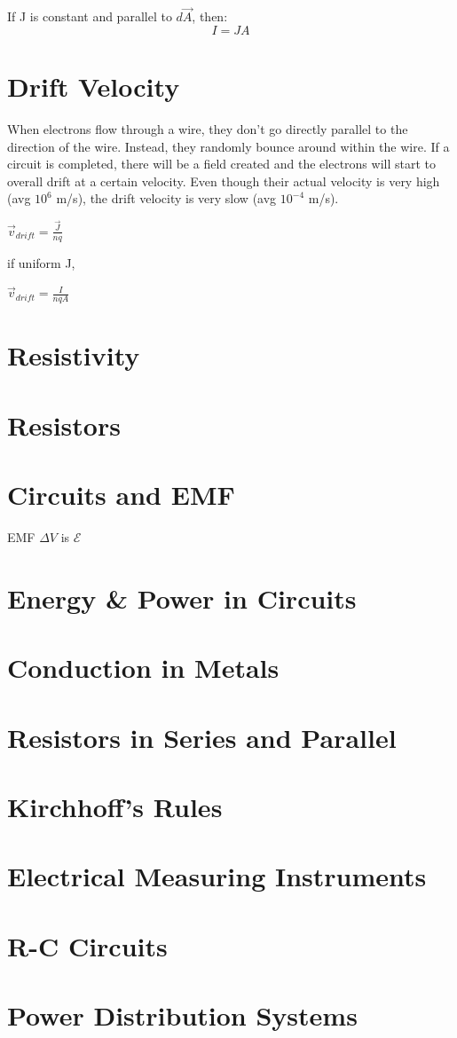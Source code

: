 \documentclass[10pt, a4paper, twocolumn]{article}
\begin{document}
            If J is constant and parallel to $d \vec{A}$, then:
            $$I = JA$$
    \section{Drift Velocity}
        When electrons flow through a wire, they don't go directly parallel to the direction of the wire. Instead, they randomly bounce around within the wire. If a circuit is completed, there will be a field created and the electrons will start to overall drift at a certain velocity. Even though their actual velocity is very high (avg $10^6$ m/s), the drift velocity is very slow (avg $10^{-4}$ m/s).

        $\vec{v}_{drift} = \frac{\vec{J}}{nq}$

        if uniform J, 

        $\vec{v}_{drift} = \frac{I}{nqA}$

    \section{Resistivity}	
    \section{Resistors}	
    \section{Circuits and EMF}	
        EMF $\Delta V$ is $\mathcal{E}$
    \section{Energy \& Power in Circuits}	
    \section{Conduction in Metals}	
    \section{Resistors in Series and Parallel}
    \section{Kirchhoff's Rules}
    \section{Electrical Measuring Instruments}
    \section{R-C Circuits}
    \section{Power Distribution Systems}
\end{document}
